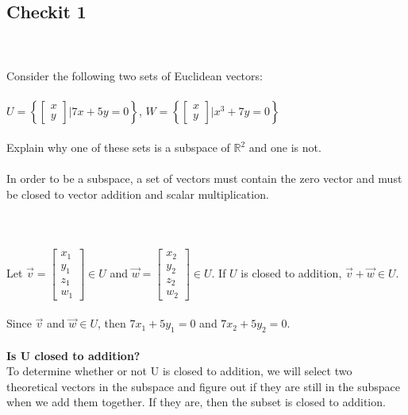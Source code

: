 \documentclass{article}
\begin{document}
\subsection*{Checkit 1}\\
\\
 Consider the following two sets of Euclidean vectors:\\
 \\
$U = \left\{ \left[ 
\begin{matrix} x \\ y \end{matrix} 
\right] \Bigg|  7x+5y=0  \right\}$, $W = \left\{ \left[ 
\begin{matrix} x \\ y \end{matrix} 
\right] \Bigg|  x^{3}+7y=0  \right\}$\\
\\
Explain why one of these sets is a subspace of $\mathbb{R}^2$ and one is not.\\
\\
In order to be a subspace, a set of vectors must contain the zero vector and must be closed to vector addition and scalar multiplication.\\
\\
\\
\\
Let 
$\vec{v} = \left[\begin{matrix}x_{1}\\y_{1}\\z_{1}\\w_{1}\end{matrix}\right] \in U$ and 
$\vec{w} = \left[\begin{matrix}x_{2}\\y_{2}\\z_{2}\\w_{2}\end{matrix}\right] \in U$. If $U$ is closed to addition, $\vec{v} + \vec{w} \in U$.\\
\\
Since $\vec{v}$ and $\vec{w} \in U$, then $7x_{1} + 5y_{1} = 0$ and $7x_{2} + 5y_{2} = 0$.\\
\\
\textbf{Is U closed to addition?}
\\
To determine whether or not U is closed to addition, we will select two theoretical vectors in the subspace and figure out if they are still in the subspace when we add them together. If they are, then the subset is closed to addition.
\end{document}
